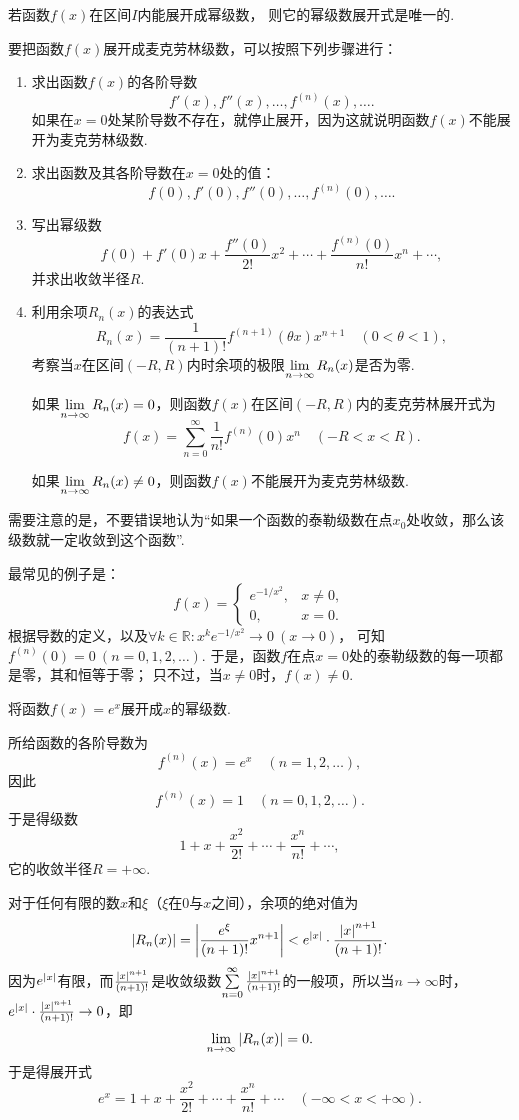 \begin{theorem}
若函数\(f(x)\)在区间\(I\)内能展开成幂级数，%
则它的幂级数展开式是唯一的.
\end{theorem}

{\color{red}
要把函数\(f(x)\)展开成麦克劳林级数，可以按照下列步骤进行：
\begin{enumerate}
\item 求出函数\(f(x)\)的各阶导数\[
f'(x),f''(x),\dotsc,f^{(n)}(x),\dotsc.
\]如果在\(x=0\)处某阶导数不存在，就停止展开，因为这就说明函数\(f(x)\)不能展开为麦克劳林级数.
\item 求出函数及其各阶导数在\(x=0\)处的值：\[
f(0),f'(0),f''(0),\dotsc,f^{(n)}(0),\dotsc.
\]
\item 写出幂级数\[
f(0) + f'(0) x + \frac{f''(0)}{2!} x^2 + \dotsb + \frac{f^{(n)}(0)}{n!} x^n + \dotsb,
\]并求出收敛半径\(R\).
\item 利用余项\(R_n(x)\)的表达式\[
R_n(x) = \frac{1}{(n+1)!} f^{(n+1)}(\theta x) x^{n+1}
\quad(0 < \theta < 1),
\]考察当\(x\)在区间\((-R,R)\)内时余项的极限\(\lim\limits_{n\to\infty} R_n(x)\)是否为零.

如果\(\lim\limits_{n\to\infty} R_n(x) = 0\)，则函数\(f(x)\)在区间\((-R,R)\)内的麦克劳林展开式为\[
f(x) = \sum\limits_{n=0}^\infty \frac{1}{n!} f^{(n)}(0) x^n
\quad(-R < x < R).
\]

如果\(\lim\limits_{n\to\infty} R_n(x) \neq 0\)，则函数\(f(x)\)不能展开为麦克劳林级数.
\end{enumerate}
}

需要注意的是，不要错误地认为“如果一个函数的泰勒级数在点\(x_0\)处收敛，那么该级数就一定收敛到这个函数”.
\begin{example}\label{example:无穷级数.函数的泰勒级数不一定收敛到函数}
最常见的例子是：\[
f(x) = \left\{ \begin{array}{ll}
e^{-1/x^2}, & x\neq0, \\
0, & x=0.
\end{array} \right.
\]
根据导数的定义，以及\(\forall k\in\mathbb{R}: x^k e^{-1/x^2} \to 0\ (x\to0)\)，%
可知\(f^{(n)}(0) = 0\ (n=0,1,2,\dotsc)\).
于是，函数\(f\)在点\(x=0\)处的泰勒级数的每一项都是零，其和恒等于零；
只不过，当\(x\neq0\)时，\(f(x)\neq0\).
\end{example}

\begin{example}
将函数\(f(x) = e^x\)展开成\(x\)的幂级数.
\begin{solution}
所给函数的各阶导数为\[
f^{(n)}(x) = e^x
\quad(n=1,2,\dotsc),
\]因此\[
f^{(n)}(x) = 1
\quad(n=0,1,2,\dotsc).
\]于是得级数\[
1+x+\frac{x^2}{2!}+\dotsb+\frac{x^n}{n!}+\dotsb,
\]它的收敛半径\(R = +\infty\).

对于任何有限的数\(x\)和\(\xi\)（\(\xi\)在\(0\)与\(x\)之间），余项的绝对值为\[
\abs{R_n(x)} = \abs{\frac{e^{\xi}}{(n+1)!} x^{n+1}}
< e^{\abs{x}} \cdot \frac{\abs{x}^{n+1}}{(n+1)!}.
\]因为\(e^{\abs{x}}\)有限，而\(\frac{\abs{x}^{n+1}}{(n+1)!}\)是收敛级数\(\sum\limits_{n=0}^\infty \frac{\abs{x}^{n+1}}{(n+1)!}\)的一般项，所以当\(n\to\infty\)时，\(e^{\abs{x}} \cdot \frac{\abs{x}^{n+1}}{(n+1)!}\to0\)，即\[
\lim\limits_{n\to\infty} \abs{R_n(x)} = 0.
\]于是得展开式\[
e^x = 1+x+\frac{x^2}{2!}+\dotsb+\frac{x^n}{n!}+\dotsb
\quad(-\infty<x<+\infty).
\]
\end{solution}
\end{example}

